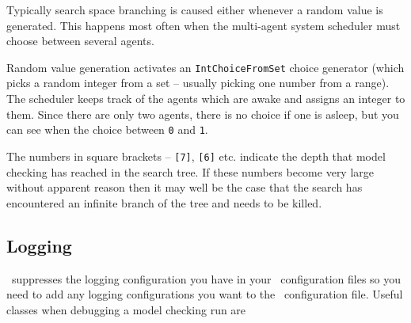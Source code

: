 Typically search space branching is caused either whenever a random value is generated.  This happens most often when the multi-agent system scheduler must choose between several agents.

Random value generation activates an \texttt{IntChoiceFromSet} choice generator (which picks a random integer from a set -- usually picking one number from a range).  The scheduler keeps track of the agents which are awake and assigns an integer to them.  Since there are only two agents, there is no choice if one is asleep, but you can see when the choice between \texttt{0} and \texttt{1}.

The numbers in square brackets -- \texttt{[7]}, \texttt{[6]} etc. indicate the depth that model checking has reached in the search tree.  If these numbers become very large without apparent reason then it may well be the case that the search has encountered an infinite branch of the tree and needs to be killed.

\subsection{Logging}
\jpf\ suppresses the logging configuration you have in your \ail\ configuration files so you need to add any logging configurations you want to the \jpf\ configuration file.  Useful classes when debugging a model checking run are

